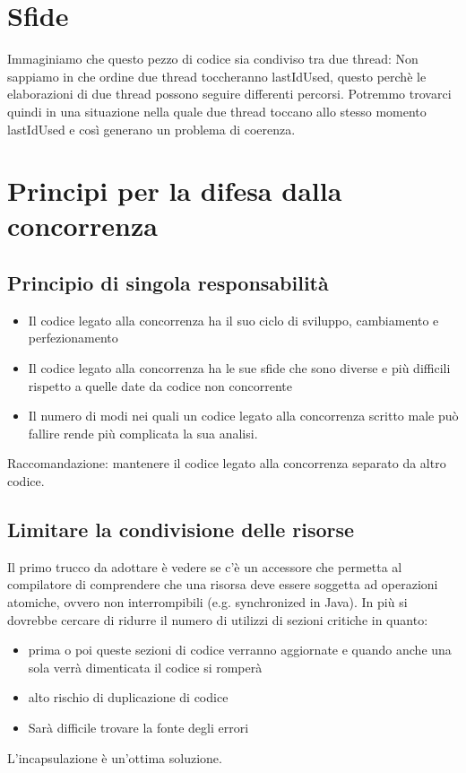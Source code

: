 \documentclass[11pt,a4paper]{book}
\begin{document}
\section{Sfide}
Immaginiamo che questo pezzo di codice sia condiviso tra due thread:
\label{code: 062}
Non sappiamo in che ordine due thread toccheranno lastIdUsed, questo perchè le elaborazioni di due thread possono seguire differenti percorsi. Potremmo trovarci quindi in una situazione nella quale due thread toccano allo stesso momento lastIdUsed e così generano un problema di coerenza.

\section{Principi per la difesa dalla concorrenza}
\subsection{Principio di singola responsabilità}
\begin{itemize}
	\item Il codice legato alla concorrenza ha il suo ciclo di sviluppo, cambiamento e perfezionamento
	\item Il codice legato alla concorrenza ha le sue sfide che sono diverse e più difficili rispetto a quelle date da codice non concorrente
	\item Il numero di modi nei quali un codice legato alla concorrenza scritto male può fallire rende più complicata la sua analisi.
\end{itemize}

Raccomandazione: mantenere il codice legato alla concorrenza separato da altro codice.

\subsection{Limitare la condivisione delle risorse}
Il primo trucco da adottare è vedere se c'è un accessore che permetta al compilatore di comprendere che una risorsa deve essere soggetta ad operazioni atomiche, ovvero non interrompibili (e.g. synchronized in Java). In più si dovrebbe cercare di ridurre il numero di utilizzi di sezioni critiche in quanto:
\begin{itemize}
	\item prima o poi queste sezioni di codice verranno aggiornate e quando anche una sola verrà dimenticata il codice si romperà
	\item alto rischio di duplicazione di codice
	\item Sarà difficile trovare la fonte degli errori
\end{itemize}
L'incapsulazione è un'ottima soluzione.
\end{document}

